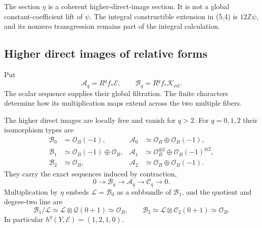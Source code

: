 The section $\eta$ is a coherent higher-direct-image section.
It is not a global constant-coefficient lift of $\psi$.
The integral constructible extension in (5.4) is
$12\mathbb Z\psi$, and its nonzero transgression remains
part of the integral calculation.

\subsection{Higher direct images of relative forms}

Put
\[
 \mathcal A_q=R^qf_*\mathscr E,\qquad
 \mathcal B_q=R^qf_*\mathcal K_{\mathrm{rel}}.
\]
The scalar sequence supplies their global filtration.
The finite characters determine how its multiplication maps
extend across the two multiple fibers.

\begin{theorem}\label{nf:thm:relative-direct-images}
The higher direct images are locally free and vanish for $q>2$.
For $q=0,1,2$ their isomorphism types are
\begin{equation}\label{nf:eq:relative-direct-images}
 \begin{aligned}
 \mathcal B_0&=\mathcal O_B(-1),&
 \mathcal A_0&\simeq\mathcal O_B\oplus\mathcal O_B(-1),\\
 \mathcal B_1&\simeq\mathcal O_B(-1)\oplus\mathcal O_B,&
 \mathcal A_1&\simeq\mathcal O_B^{\oplus2}
                         \oplus\mathcal O_B(-1)^{\oplus2},\\
 \mathcal B_2&\simeq\mathcal O_B,&
 \mathcal A_2&\simeq\mathcal O_B\oplus\mathcal O_B(-1).
 \end{aligned}
\end{equation}
They carry the exact sequences induced by contraction,
\begin{equation}\label{nf:eq:A-filtration}
 0\longrightarrow\mathcal B_q
 \longrightarrow\mathcal A_q
 \longrightarrow\mathcal C_q\longrightarrow0.
\end{equation}
Multiplication by $\eta$ embeds
$\mathcal L=\mathcal B_0$ as a subbundle of $\mathcal B_1$,
and the quotient and degree-two line are
\begin{equation}\label{nf:eq:elementary-modifications}
 \mathcal B_1/\mathcal L
   \simeq\mathcal L\otimes\mathcal Q(0+1)\simeq\mathcal O_B,
 \qquad
 \mathcal B_2\simeq\mathcal L\otimes\mathcal C_2(0+1)
                   \simeq\mathcal O_B.
\end{equation}
In particular $h^q(Y,\mathscr E)=(1,2,1,0)$.
\end{theorem}

